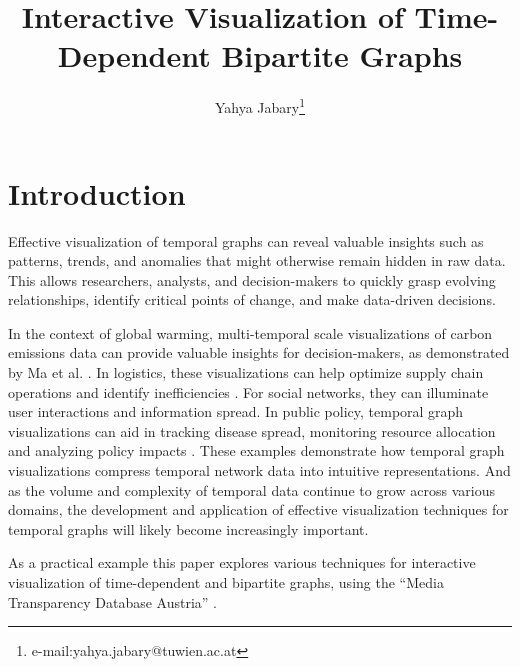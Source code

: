 \documentclass{vgtc}
\title{Interactive Visualization of Time-Dependent Bipartite Graphs}
\author{Yahya Jabary\thanks{e-mail:yahya.jabary@tuwien.ac.at}}
\affiliation{\scriptsize TU Wien}
\begin{document}
  
\maketitle


\section{Introduction} %

Effective visualization of temporal graphs can reveal valuable insights such as patterns, trends, and anomalies that might otherwise remain hidden in raw data. This allows researchers, analysts, and decision-makers to quickly grasp evolving relationships, identify critical points of change, and make data-driven decisions.

In the context of global warming, multi-temporal scale visualizations of carbon emissions data can provide valuable insights for decision-makers, as demonstrated by Ma et al. \cite{ma2023histgnn}. In logistics, these visualizations can help optimize supply chain operations and identify inefficiencies \cite{Yang2019AnimatedMS} \cite{Tamilmani2019ModellingAA}. For social networks, they can illuminate user interactions and information spread. In public policy, temporal graph visualizations can aid in tracking disease spread, monitoring resource allocation and analyzing policy impacts \cite{chung2023temporal}.
These examples demonstrate how temporal graph visualizations compress temporal network data into intuitive representations. And as the volume and complexity of temporal data continue to grow across various domains, the development and application of effective visualization techniques for temporal graphs will likely become increasingly important.

\medskip

As a practical example this paper explores various techniques for interactive visualization of time-dependent and bipartite graphs, using the ``Media Transparency Database Austria'' \cite{dataset}.
\end{document}
